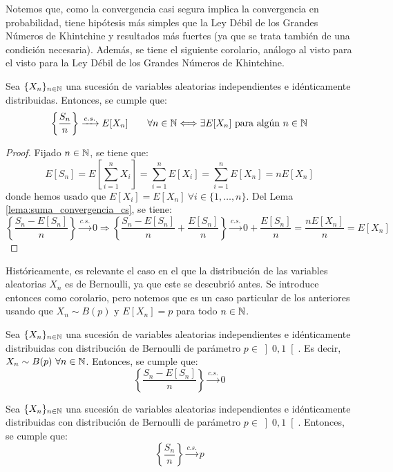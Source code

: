 Notemos que, como la convergencia casi segura implica la convergencia en probabilidad, tiene hipótesis más simples que la Ley Débil de los Grandes Números de Khintchine y resultados más fuertes (ya que se trata también de una condición necesaria). Además, se tiene el siguiente corolario, análogo al visto para el visto para la Ley Débil de los Grandes Números de Khintchine.
\begin{coro}
    Sea $\{X_n\}_{n\in \mathbb{N}}$ una sucesión de variables aleatorias independientes e idénticamente distribuidas. Entonces, se cumple que:
    \begin{equation*}
        \left\{\frac{S_n}{n}\right\} \xrightarrow{c.s.} E[X_n]\qquad \forall n\in \mathbb{N}
        \Longleftrightarrow \exists E[X_n] \text{ para algún } n\in \mathbb{N}
    \end{equation*}
\end{coro}
\begin{proof}
    Fijado $n\in \mathbb{N}$, se tiene que:
    \begin{equation*}
        E[S_n] = E\left[\sum_{i=1}^{n} X_i\right] = \sum_{i=1}^{n} E[X_i] = \sum_{i=1}^{n} E[X_n] = nE[X_n]
    \end{equation*}
    donde hemos usado que $E[X_i]=E[X_n]~\forall i\in \{1,\ldots,n\}$. Del Lema \ref{lema:suma_convergencia_cs}, se tiene:
    \begin{equation*}
        \left\{\frac{S_n-E[S_n]}{n}\right\} \xrightarrow{c.s.} 0 \Longrightarrow 
        \left\{\frac{S_n-E[S_n]}{n}+\frac{E[S_n]}{n}\right\} \xrightarrow{c.s.} 0+\frac{E[S_n]}{n}=\frac{nE[X_n]}{n}=E[X_n]
    \end{equation*}
\end{proof}

Históricamente, es relevante el caso en el que la distribución de las variables aleatorias $X_n$ es de Bernoulli, ya que este se descubrió antes. Se introduce entonces como corolario, pero notemos que es un caso particular de los anteriores usando que $X_n\sim B(p)$ y $E[X_n]=p$ para todo $n\in \mathbb{N}$.
\begin{coro}
    Sea $\{X_n\}_{n\in \mathbb{N}}$ una sucesión de variables aleatorias independientes e idénticamente distribuidas con distribución de Bernoulli de parámetro $p\in \left]0,1\right[$. Es decir, $X_n\sim B(p)~\forall n\in \mathbb{N}$. Entonces, se cumple que:
    \begin{equation*}
        \left\{\frac{S_n-E[S_n]}{n}\right\} \xrightarrow{c.s.} 0
    \end{equation*}
\end{coro}
\begin{coro}
    Sea $\{X_n\}_{n\in \mathbb{N}}$ una sucesión de variables aleatorias independientes e idénticamente distribuidas con distribución de Bernoulli de parámetro $p\in \left]0,1\right[$. Entonces, se cumple que:
    \begin{equation*}
        \left\{\frac{S_n}{n}\right\} \xrightarrow{c.s.} p
    \end{equation*}
\end{coro}


